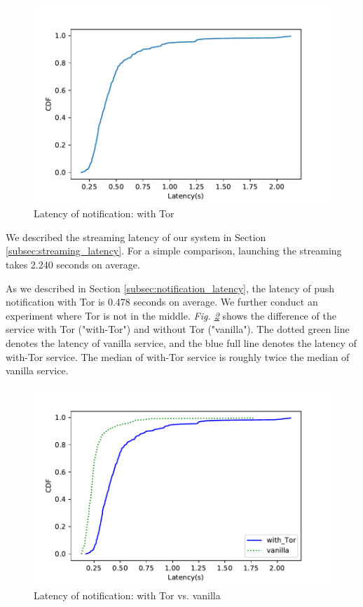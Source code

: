 \begin{figure}
	\includegraphics[width=\linewidth]{notification_latency_withTor.pdf}
	\caption{Latency of notification: with Tor}
	\label{fig:notificationlatency_wTor}
\end{figure}


We described the streaming latency of our system in Section \ref{subsec:streaming_latency}. For a simple comparison, launching the streaming takes 2.240 seconds on average.


As we described in Section \ref{subsec:notification_latency}, the latency of push notification with Tor is 0.478 seconds on average. We further conduct an experiment where Tor is not in the middle. \textit{Fig. \ref{fig:notificationlatency_wTor_vs_vanilla}} shows the difference of the service with Tor ("with-Tor") and without Tor ("vanilla"). The dotted green line denotes the latency of vanilla service, and the blue full line denotes the latency of with-Tor service. The median of with-Tor service is roughly twice the median of vanilla service.

\begin{figure}
	\includegraphics[width=\linewidth]{plot_push_tor_vs_vanilla.pdf}
	\caption{Latency of notification: with Tor vs. vanilla}
	\label{fig:notificationlatency_wTor_vs_vanilla}
\end{figure}